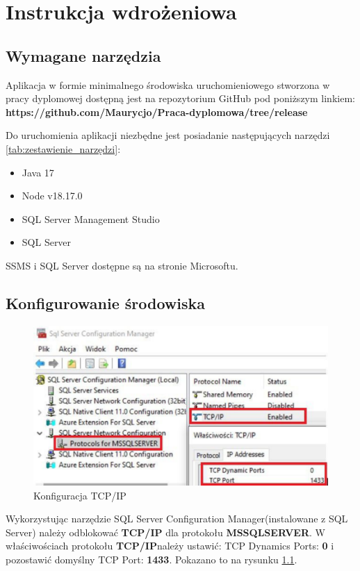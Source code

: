 \chapter{Instrukcja wdrożeniowa}

\section{Wymagane narzędzia}
Aplikacja w formie minimalnego środowiska uruchomieniowego stworzona w pracy dyplomowej dostępną jest na repozytorium GitHub pod poniższym linkiem: \newline
 \textbf{https://github.com/Maurycjo/Praca-dyplomowa/tree/release}
\newline

Do uruchomienia aplikacji niezbędne jest posiadanie następujących narzędzi \ref{tab:zestawienie_narzędzi}: 
\begin{itemize}
	\item Java 17
	\item Node v18.17.0
	\item SQL Server Management Studio
	\item SQL Server 
\end{itemize}

SSMS i SQL Server dostępne są na stronie Microsoftu.


\section{Konfigurowanie środowiska}

\begin{figure}[b]
		\centering
    \includegraphics[width=0.6\linewidth]{rysA/tcpip.pdf}
    \caption{Konfiguracja TCP/IP}
    \label{tcpip:label}
\end{figure}

Wykorzystując narzędzie SQL Server Configuration Manager(instalowane z SQL Server) należy odblokować \textbf{TCP/IP} dla protokołu \textbf{MSSQLSERVER}. W właściwościach protokołu \textbf{TCP/IP}należy ustawić: TCP Dynamics Ports: \textbf{0} i pozostawić domyślny TCP Port: \textbf{1433}. Pokazano to na rysunku \ref{tcpip:label}.


